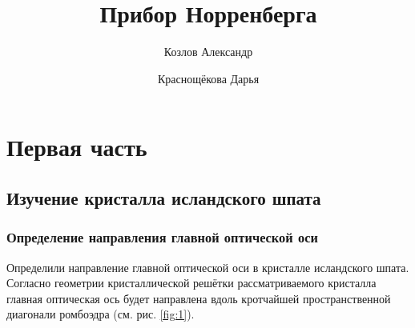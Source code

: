 \documentclass[12pt]{article}
\title{Прибор Норренберга}
\author{Козлов Александр \and Краснощёкова Дарья}
\begin{document}
	\maketitle
	\section{Первая часть}
	\subsection{Изучение кристалла исландского шпата}
	\subsubsection{Определение направления главной оптической оси}
	Определили направление главной оптической оси в кристалле исландского шпата. Согласно геометрии кристаллической решётки рассматриваемого кристалла главная оптическая ось будет направлена вдоль кротчайшей пространственной диагонали ромбоэдра (см. рис. \ref{fig:1}).
\end{document}
